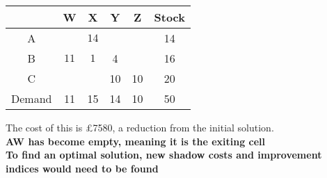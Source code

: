 \documentclass{article}[18pt]
\newcommand{\cblue}[1]{\color{blue}#1}
\begin{document}
\begin{center}
\begin{tabular}{ |c|c|c|c|c|c| }
\hline
&W&X&Y&Z&Stock\\
\hline
A&&\cblue{$14$}&&&14\\
\hline
B&\cblue{$11$}&\cblue{$1$}&\cblue{4}&&16\\
\hline
C&&&\cblue{10}&\cblue{10}&20\\
\hline
Demand&11&15&14&10&50\\ 
\hline
\end{tabular}
\end{center}
The cost of this is £7580, a reduction from the initial solution.\\
\textbf{AW has become empty, meaning it is the exiting cell}\\
\textbf{To find an optimal solution, new shadow costs and improvement indices would need to be found}
\end{document}
